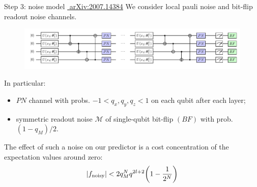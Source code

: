 \documentclass[8pt, xcolor={svgnames}, hyperref={linkcolor=black}]{beamer}
\begin{document}
\begin{frame}{Step 3: noise model \hfill \href{https://arxiv.org/abs/2007.14384}{\faBook\,\,arXiv:2007.14384}}
We consider local pauli noise and bit-flip readout noise channels.
\pause
\begin{figure}
\includegraphics[width=1\textwidth]{figures/noisy.pdf}
\end{figure}
\pause
In particular:
\begin{itemize}[noitemsep]
\item[\faVolumeUp] $PN$ channel with probs. $-1 < q_x, q_y, q_z < 1$
on each qubit after each layer;
\item[\faRandom] symmetric readout noise $\mathcal{M}$ of single-qubit bit-flip $(BF)$ 
with prob. $(1-q_M)/2$.
\end{itemize}
\pause
The effect of such a noise on our predictor is a cost concentration of the expectation
values around zero:
\pause
$$ |f_{\rm noisy}| < 2 q_M^N q^{2l + 2} \biggl(1-\frac{1}{2^N}\biggr) $$
\end{frame}
\end{document}
